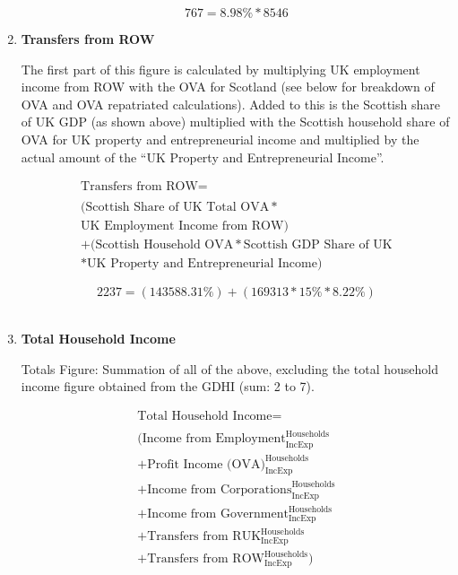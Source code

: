 \begin{enumerate}
\begin{equation}\nonumber
767=8.98\%*8546
\end{equation}


\item \textbf {Transfers from ROW}

The first part of this figure is calculated by multiplying UK employment income from ROW with the OVA for Scotland (see below for breakdown of OVA and OVA repatriated calculations). Added to this is the Scottish share of UK GDP (as shown above) multiplied with the Scottish household share of OVA for UK property and entrepreneurial income and multiplied by the actual amount of the “UK Property and Entrepreneurial Income”. \cite{ScotGov2013a,ONS2011c,ScotGov2013b}

\begin{equation}
\begin{split}
\text{Transfers from ROW} =  \\ \\
(\text{Scottish Share of UK Total OVA}*\\
\text{UK Employment Income from ROW})\\
+(\text{Scottish Household OVA}*\text{Scottish GDP Share of UK}\\
*\text{UK Property and Entrepreneurial Income})
\end{split} \label{eq:2.5.11}
\end{equation}


\begin{equation} \nonumber
2237 = (143588.31\%)+(169313*15\%*8.22\%)
\end{equation}\\

\item \textbf {Total Household Income}

Totals Figure: Summation of all of the above, excluding the total household income figure obtained from the GDHI (sum: 2 to 7).

\begin{equation}
\begin{split}
\text{Total Household Income} =  \\ \\
(\text{Income from Employment}^\text{Households}_\text{IncExp}\\
+\text{Profit Income (OVA)}^\text{Households}_\text{IncExp}\\
+\text{Income from Corporations}^\text{Households}_\text{IncExp}\\
+\text{Income from Government}^\text{Households}_\text{IncExp}\\
+\text{Transfers from RUK}^\text{Households}_\text{IncExp}\\
+\text{Transfers from ROW}^\text{Households}_\text{IncExp})
\end{split} \label{eq:2.5.12}
\end{equation}


\end{enumerate}
